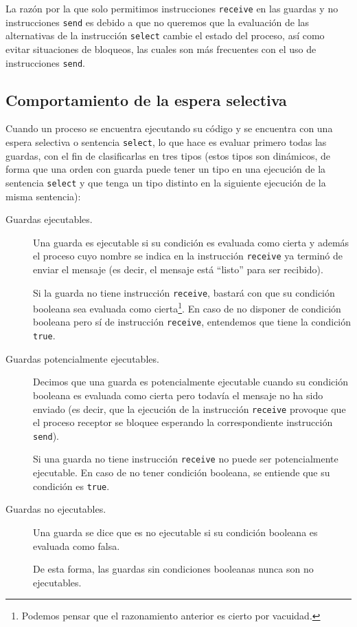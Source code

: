 La razón por la que solo permitimos instrucciones \verb|receive| en las guardas y no instrucciones \verb|send| es debido a que no queremos que la evaluación de las alternativas de la instrucción \verb|select| cambie el estado del proceso, así como evitar situaciones de bloqueos, las cuales son más frecuentes con el uso de instrucciones \verb|send|.

\subsection{Comportamiento de la espera selectiva}
Cuando un proceso se encuentra ejecutando su código y se encuentra con una espera selectiva o sentencia \verb|select|, lo que hace es evaluar primero todas las guardas, con el fin de clasificarlas en tres tipos (estos tipos son dinámicos, de forma que una orden con guarda puede tener un tipo en una ejecución de la sentencia \verb|select| y que tenga un tipo distinto en la siguiente ejecución de la misma sentencia):
\begin{description}
    \item [Guardas ejecutables.] Una guarda es ejecutable si su condición es evaluada como cierta y además el proceso cuyo nombre se indica en la instrucción \verb|receive| ya terminó de enviar el mensaje (es decir, el mensaje está ``listo'' para ser recibido).

        Si la guarda no tiene instrucción \verb|receive|, bastará con que su condición booleana sea evaluada como cierta\footnote{Podemos pensar que el razonamiento anterior es cierto por vacuidad.}. En caso de no disponer de condición booleana pero sí de instrucción \verb|receive|, entendemos que tiene la condición \verb|true|.
    \item [Guardas potencialmente ejecutables.] Decimos que una guarda es potencialmente ejecutable cuando su condición booleana es evaluada como cierta pero todavía el mensaje no ha sido enviado (es decir, que la ejecución de la instrucción \verb|receive| provoque que el proceso receptor se bloquee esperando la correspondiente instrucción \verb|send|).

        Si una guarda no tiene instrucción \verb|receive| no puede ser potencialmente ejecutable. En caso de no tener condición booleana, se entiende que su condición es \verb|true|.
    \item [Guardas no ejecutables.] Una guarda se dice que es no ejecutable si su condición booleana es evaluada como falsa.

        De esta forma, las guardas sin condiciones booleanas nunca son no ejecutables.
\end{description}

